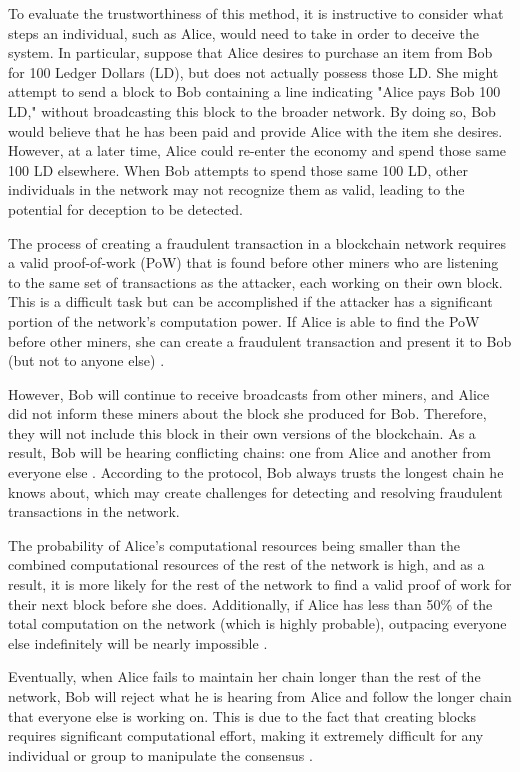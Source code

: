 To evaluate the trustworthiness of this method, it is instructive to consider what steps an individual, such as Alice, would need to take in order to deceive the system. In particular, suppose that Alice desires to purchase an item from Bob for 100 Ledger Dollars (LD), but does not actually possess those LD. She might attempt to send a block to Bob containing a line indicating "Alice pays Bob 100 LD," without broadcasting this block to the broader network. By doing so, Bob would believe that he has been paid and provide Alice with the item she desires. However, at a later time, Alice could re-enter the economy and spend those same 100 LD elsewhere. When Bob attempts to spend those same 100 LD, other individuals in the network may not recognize them as valid, leading to the potential for deception to be detected.

The process of creating a fraudulent transaction in a blockchain network requires a valid proof-of-work (PoW) that is found before other miners who are listening to the same set of transactions as the attacker, each working on their own block. This is a difficult task but can be accomplished if the attacker has a significant portion of the network's computation power. If Alice is able to find the PoW before other miners, she can create a fraudulent transaction and present it to Bob (but not to anyone else) \cite{fang2022cryptocurrency}.

However, Bob will continue to receive broadcasts from other miners, and Alice did not inform these miners about the block she produced for Bob. Therefore, they will not include this block in their own versions of the blockchain. As a result, Bob will be hearing conflicting chains: one from Alice and another from everyone else \cite{TAN2022101625}. According to the protocol, Bob always trusts the longest chain he knows about, which may create challenges for detecting and resolving fraudulent transactions in the network.

The probability of Alice's computational resources being smaller than the combined computational resources of the rest of the network is high, and as a result, it is more likely for the rest of the network to find a valid proof of work for their next block before she does. Additionally, if Alice has less than 50\% of the total computation on the network (which is highly probable), outpacing everyone else indefinitely will be nearly impossible \cite{nakamoto2008bitcoin}.

Eventually, when Alice fails to maintain her chain longer than the rest of the network, Bob will reject what he is hearing from Alice and follow the longer chain that everyone else is working on. This is due to the fact that creating blocks requires significant computational effort, making it extremely difficult for any individual or group to manipulate the consensus \cite{szabo2005bit}.

